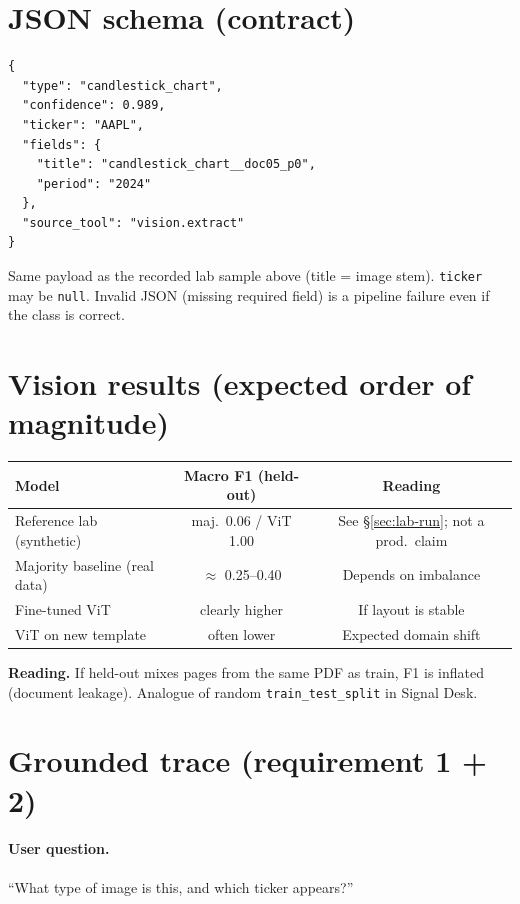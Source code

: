 \documentclass[11pt,a4paper]{article}
\begin{document}
\section{JSON schema (contract)}

\begin{verbatim}
{
  "type": "candlestick_chart",
  "confidence": 0.989,
  "ticker": "AAPL",
  "fields": {
    "title": "candlestick_chart__doc05_p0",
    "period": "2024"
  },
  "source_tool": "vision.extract"
}
\end{verbatim}

Same payload as the recorded lab sample above (title = image stem).
\texttt{ticker} may be \texttt{null}. Invalid JSON (missing required field)
is a pipeline failure even if the class is correct.

\section{Vision results (expected order of magnitude)}

\begin{center}
\renewcommand{\arraystretch}{1.2}
\begin{tabular}{@{}lcc@{}}
\toprule
\textbf{Model} & \textbf{Macro F1 (held-out)} & \textbf{Reading} \\
\midrule
Reference lab (synthetic) & maj.\ 0.06 / ViT 1.00 & See \S\ref{sec:lab-run}; not a prod.\ claim \\
Majority baseline (real data) & $\approx$ 0.25--0.40 & Depends on imbalance \\
Fine-tuned ViT & clearly higher & If layout is stable \\
ViT on new template & often lower & Expected domain shift \\
\bottomrule
\end{tabular}
\end{center}

{\color{warn}\textbf{Reading.}
If held-out mixes pages from the same PDF as train, F1 is inflated
(document leakage). Analogue of random \texttt{train\_test\_split} in Signal Desk.}

\section{Grounded trace (requirement 1 + 2)}

\paragraph{User question.} ``What type of image is this, and which ticker appears?''
\end{document}
